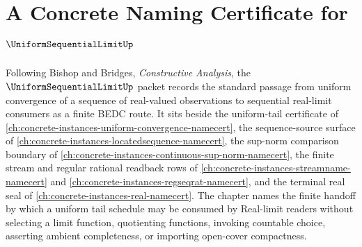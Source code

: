 \chapter{A Concrete Naming Certificate for $\UniformSequentialLimitUp$}
\label{ch:concrete-instances-uniform-sequential-limit-namecert}

Following Bishop and Bridges, \emph{Constructive Analysis}, the $\UniformSequentialLimitUp$ packet records the standard passage from uniform convergence of a sequence of real-valued observations to sequential real-limit consumers as a finite BEDC route. It sits beside the uniform-tail certificate of \autoref{ch:concrete-instances-uniform-convergence-namecert}, the sequence-source surface of \autoref{ch:concrete-instances-locatedsequence-namecert}, the sup-norm comparison boundary of \autoref{ch:concrete-instances-continuous-sup-norm-namecert}, the finite stream and regular rational readback rows of \autoref{ch:concrete-instances-streamname-namecert} and \autoref{ch:concrete-instances-regseqrat-namecert}, and the terminal real seal of \autoref{ch:concrete-instances-real-namecert}. The chapter names the finite handoff by which a uniform tail schedule may be consumed by Real-limit readers without selecting a limit function, quotienting functions, invoking countable choice, asserting ambient completeness, or importing open-cover compactness.

